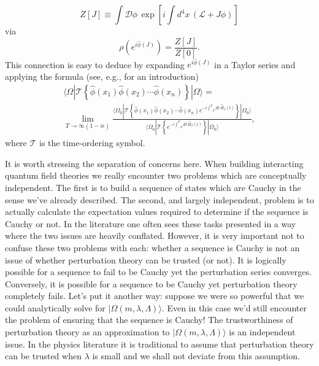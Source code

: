 \documentclass[11pt]{amsart}
\theoremstyle{plain}%
\theoremstyle{definition}
\theoremstyle{remark}
\begin{document}
\begin{equation}
	Z[J] \equiv  \int\mathcal{D}\phi\, \exp\left[i\int d^4 x\, (\mathcal{L} + J\phi)\right]
\end{equation}
via
\begin{equation}
	\rho\left(e^{i\widehat{\phi}(J)}\right) = \frac{Z[J]}{Z[0]}.
\end{equation}
This connection is easy to deduce by expanding $e^{i\widehat{\phi}(J)}$ in a Taylor series and applying the formula (see, e.g., \cite{peskin_introduction_1995} for an introduction)
\begin{multline}
	\langle \Omega|\mathcal{T}\left\{\widehat{\phi}(x_1)\widehat{\phi}(x_2)\cdots \widehat{\phi}(x_n)\right\}|\Omega\rangle =\\ \lim_{T\rightarrow\infty(1-i\epsilon)} \frac{\langle \Omega_0|\mathcal{T}\left\{\widehat{\phi}(x_1)\widehat{\phi}(x_2)\cdots \widehat{\phi}(x_n)e^{-i\int_{-T}^{T} dt\, \widehat{H}_I(t)}\right\}|\Omega_0\rangle}{\langle \Omega_0|\mathcal{T}\left\{e^{-i\int_{-T}^{T} dt\, \widehat{H}_I(t)}\right\}|\Omega_0\rangle},
\end{multline}
where $\mathcal{T}$ is the time-ordering symbol.

It is worth stressing the separation of concerns here. When building interacting quantum field theories we really encounter two problems which are conceptually independent. The first is to build a sequence of states which are Cauchy in the sense we've already described. The second, and largely independent, problem is to actually calculate the expectation values required to determine if the sequence is Cauchy or not. In the literature one often sees these tasks presented in a way where the two issues are heavily conflated. However, it is very important not to confuse these two problems with each: whether a sequence is Cauchy is not an issue of whether perturbation theory can be trusted (or not). It is logically possible for a sequence to fail to be Cauchy yet the perturbation series converges. Conversely, it is possible for a sequence to be Cauchy yet perturbation theory completely fails. Let's put it another way: suppose we were so powerful that we could analytically solve for $|\Omega(m,\lambda, \Lambda)\rangle$. Even in this case we'd still encounter the problem of ensuring that the sequence is Cauchy! The trustworthiness of perturbation theory as an approximation to $|\Omega(m,\lambda, \Lambda)\rangle$ is an independent issue. In the physics literature it is traditional to assume that perturbation theory can be trusted when $\lambda$ is small and we shall not deviate from this assumption.
\end{document}
